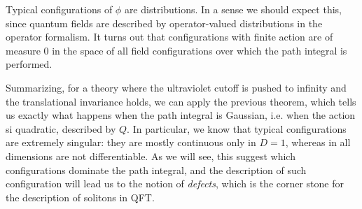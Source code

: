 \documentclass[../main/main.tex]{subfiles}
\begin{document}
Typical configurations of $\phi$ are distributions. In a sense we should expect this, since quantum fields are described by operator-valued distributions in the operator formalism. It turns out that configurations with finite action are of measure 0 in the space of all field configurations over which the path integral is performed. 

Summarizing, for a theory where the ultraviolet cutoff is pushed to infinity and the translational invariance holds, we can apply the previous theorem, which tells us exactly what happens when the path integral is Gaussian, i.e. when the action si quadratic, described by $Q$.  In particular, we know that typical configurations are extremely singular: they are mostly continuous only in $D=1$, whereas in all dimensions are not differentiable. As we will see, this suggest which configurations dominate the path integral, and the description of such configuration will lead us to the notion of \emph{defects}, which is the corner stone for the description of solitons in QFT. 

\skipline





\end{document}
